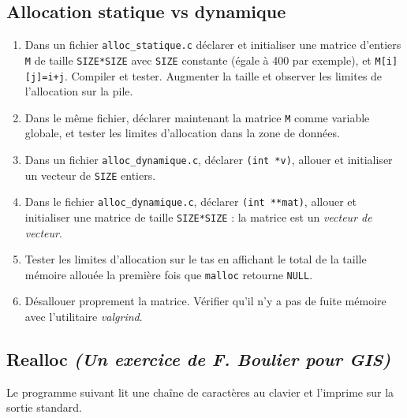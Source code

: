\documentclass[final, pdftex, a4paper, openbib, ]{article}
\begin{document}
\subsection{Allocation statique vs dynamique}
\begin{enumerate}
	\item Dans un fichier \texttt{alloc\_statique.c} déclarer et initialiser une matrice d'entiers \texttt{M} de taille \texttt{SIZE*SIZE} avec \texttt{SIZE} constante (égale à 400 par exemple), et \texttt{M[i][j]=i+j}. Compiler et tester. Augmenter la taille et observer les limites de l'allocation sur la pile.
	\item Dans le même fichier, déclarer maintenant la matrice \texttt{M} comme variable globale, et tester les limites d'allocation dans la zone de données.
	\item Dans un fichier \texttt{alloc\_dynamique.c}, déclarer \texttt{(int *v)}, allouer et initialiser un vecteur de \texttt{SIZE} entiers.
	\item Dans le fichier \texttt{alloc\_dynamique.c}, déclarer \texttt{(int **mat)}, allouer et initialiser une matrice de taille \texttt{SIZE*SIZE} : la matrice est un \textit{vecteur de vecteur}.
	\item Tester les limites d'allocation sur le tas en affichant le total de la taille mémoire allouée la première
	fois que \texttt{malloc} retourne \texttt{NULL}.
	\item Désallouer proprement la matrice. Vérifier qu'il n'y a pas de fuite mémoire avec l'utilitaire \textit{valgrind}.
\end{enumerate}


\subsection{Realloc \small \textit{(Un exercice de F. Boulier pour GIS)}}
Le programme suivant lit une chaîne de caractères au clavier et l'imprime sur la sortie standard.
\end{document}
